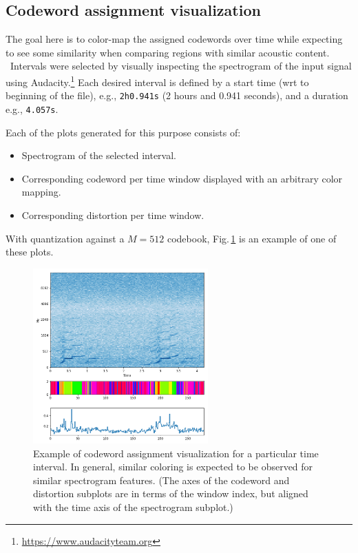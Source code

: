 \documentclass[letterpaper,12pt]{article}
\begin{document}
    \subsection*{Codeword assignment visualization}

    The goal here is to color-map the assigned codewords over time while expecting to
    see some similarity when comparing regions with similar acoustic content.
    \
    Intervals were selected by visually inspecting the spectrogram of the input signal
    using Audacity.\footnote{
        \url{https://www.audacityteam.org}
    }
    Each desired interval is defined by a start time (wrt to beginning of the file),
    e.g., \verb|2h0.941s| (2 hours and 0.941 seconds), and a duration e.g., \verb|4.057s|.

    Each of the plots generated for this purpose consists of:

    \begin{itemize}
        \item Spectrogram of the selected interval.
        \item Corresponding codeword per time window displayed with an arbitrary color mapping.
        \item Corresponding distortion per time window.
    \end{itemize}

    With quantization against a $M=512$ codebook,
    Fig.\,\ref{fig:spectrogram_and_quantization_M_512} is an example of one of these plots.
    \
    \begin{figure}[!ht]
        \centering
        \includegraphics[width=0.6\textwidth]{spectrogram_and_quantization_M_512.png}
        \caption{
            Example of codeword assignment visualization for a particular time interval.
            In general, similar coloring is expected to be observed for similar spectrogram features.
            (The axes of the codeword and distortion subplots are in terms of the
            window index, but aligned with the time axis of the spectrogram subplot.)
        }
        \label{fig:spectrogram_and_quantization_M_512}
    \end{figure}

    \clearpage
    
    
\end{document}
